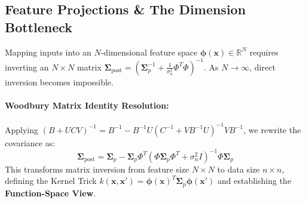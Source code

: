 \documentclass[11pt,a4paper]{article}
\begin{document}
\subsection{Feature Projections \& The Dimension Bottleneck}
Mapping inputs into an $N$-dimensional feature space $\boldsymbol{\phi}(\mathbf{x}) \in \mathbb{R}^N$ requires inverting an $N \times N$ matrix $\boldsymbol{\Sigma}_{\text{post}} = \left(\boldsymbol{\Sigma}_p^{-1} + \frac{1}{\sigma_n^2} \Phi^T \Phi\right)^{-1}$. As $N \to \infty$, direct inversion becomes impossible.

\paragraph{Woodbury Matrix Identity Resolution:}
Applying $(B + U C V)^{-1} = B^{-1} - B^{-1} U (C^{-1} + V B^{-1} U)^{-1} V B^{-1}$, we rewrite the covariance as:
\begin{equation}
  \boldsymbol{\Sigma}_{\text{post}} = \boldsymbol{\Sigma}_p - \boldsymbol{\Sigma}_p \Phi^T \left(\Phi \boldsymbol{\Sigma}_p \Phi^T + \sigma_n^2 I\right)^{-1} \Phi \boldsymbol{\Sigma}_p
\end{equation}
This transforms matrix inversion from feature size $N \times N$ to data size $n \times n$, defining the Kernel Trick $k(\mathbf{x}, \mathbf{x}') = \boldsymbol{\phi}(\mathbf{x})^T \boldsymbol{\Sigma}_p \boldsymbol{\phi}(\mathbf{x}')$ and establishing the \textbf{Function-Space View}.
\end{document}
